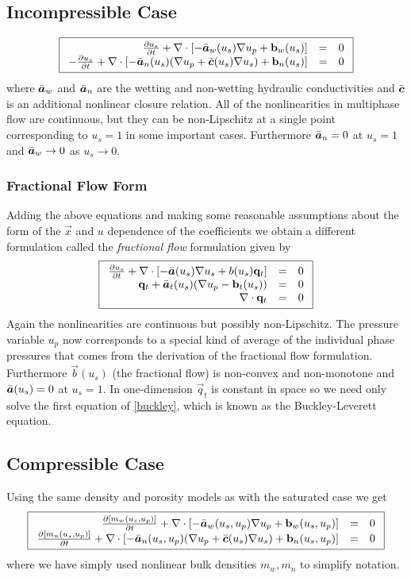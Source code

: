 \documentclass[12pt,dvips,letterpaper]{article}
\begin{document}
\subsection{Incompressible Case}

\begin{equation}
\fbox{$ \begin{array}{rcl} 
\frac{\partial {u_s}}{\partial {t}} + \nabla \cdot \left[ - \bar{\mbox{{\boldmath ${a}$}}}_w ( u_s) \nabla u_p + {\bf b}_w(u_s) \right] &=& 0 \\
-\frac{\partial {u_s}}{\partial {t}} + \nabla \cdot \left[ - \bar{\mbox{{\boldmath ${a}$}}}_n ( u_s) (\nabla u_p + \bar{\mbox{{\boldmath ${c}$}}}(u_s) \nabla u_s) + {\bf b}_n(u_s) \right] &=& 0  \end{array} $}
\end{equation}
where $\bar{\mbox{{\boldmath ${a}$}}}_w$ and $\bar{\mbox{{\boldmath ${a}$}}}_n$ are the wetting and non-wetting
hydraulic conductivities and $\bar{\mbox{{\boldmath ${c}$}}}$ is an additional nonlinear closure
relation. All of the nonlinearities in multiphase flow are continuous,
but they can be non-Lipschitz at a single point corresponding to
$u_s=1$ in some important cases. Furthermore $\bar{\mbox{{\boldmath ${a}$}}}_n = 0$ at
$u_s=1$ and $\bar{\mbox{{\boldmath ${a}$}}}_w \rightarrow 0 $ as $u_s \rightarrow 0$.

\subsubsection{Fractional Flow Form}

Adding the above equations and making some reasonable assumptions
about the form of the $\vec x$ and $u$ dependence of the coefficients
we obtain a different formulation called the {\em fractional flow}
formulation given by
\begin{equation}
\fbox{$ \begin{array}{rcl} 
\frac{\partial {u_s}}{\partial {t}} + \nabla \cdot \left[ - \bar{\mbox{{\boldmath ${a}$}}}(u_s) \nabla u_s + b(u_s) {\bf q}_t \right] &=& 0  \label{buckley}\\
{\bf q}_t + \bar{\mbox{{\boldmath ${a}$}}}_t(u_s) ( \nabla u_p - {\bf b}_t(u_s) )  &=& 0\\
\nabla \cdot {\bf q}_t &=& 0  \end{array} $}
\end{equation}
Again the nonlinearities are continuous but possibly non-Lipschitz.
The pressure variable $u_p$ now corresponds to a special kind of
average of the individual phase pressures that comes from the
derivation of the fractional flow formulation.  Furthermore $\vec b(u_s)$
(the fractional flow) is non-convex and non-monotone and $\bar{\mbox{{\boldmath ${a}$}}}(u_s)
= 0$ at $u_s=1$. In one-dimension $\vec q_t$ is constant in space so
we need only solve the first equation of \ref{buckley}, which is known as the
Buckley-Leverett equation.

\subsection{Compressible Case} 
Using the same density and porosity models as with the saturated case we get
\begin{equation}
\fbox{$ \begin{array}{rcl} 
\frac{\partial {[m_w(u_s,u_p)]}}{\partial {t}} + \nabla \cdot \left[ - \bar{\mbox{{\boldmath ${a}$}}}_w ( u_s,u_p) \nabla u_p + {\bf b}_w(u_s,u_p) \right] &=& 0 \\
\frac{\partial {[m_n(u_s,u_p)]}}{\partial {t}} + \nabla \cdot \left[ - \bar{\mbox{{\boldmath ${a}$}}}_n ( u_s,u_p) (\nabla u_p + \bar{\mbox{{\boldmath ${c}$}}}(u_s) \nabla u_s) + {\bf b}_n(u_s,u_p) \right] &=& 0  \end{array} $}
\end{equation}
where we have simply used nonlinear bulk densities $m_w,m_n$ to simplify notation.
\end{document}

